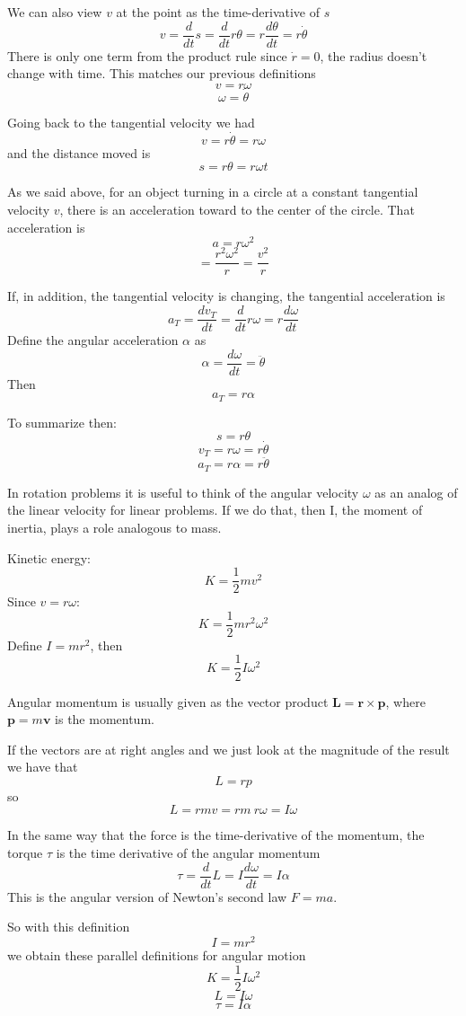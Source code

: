 \documentclass[11pt, oneside]{article}
\begin{document}
We can also view $v$ at the point as the time-derivative of $s$
\[ v = \frac{d}{dt} s = \frac{d}{dt} r \theta = r \frac{d \theta}{dt} = r \dot{\theta} \]
There is only one term from the product rule since $\dot{r} = 0$, the radius doesn't change with time.  This matches our previous definitions
\[ v = r \omega \]
\[ \omega = \dot{\theta} \]

Going back to the tangential velocity we had
\[ v = r \dot{\theta} = r \omega \]
and the distance moved is
\[ s = r \theta = r \omega t \]

As we said above, for an object turning in a circle at a constant tangential velocity $v$, there is an acceleration toward to the center of the circle.  That acceleration is
\[ a = r \omega^2  \]
\[ = \frac{r^2 \omega^2}{r} = \frac{v^2}{r} \]

If, in addition, the tangential velocity is changing, the tangential acceleration is
\[ a_T = \frac{dv_T}{dt} = \frac{d}{dt} r \omega = r \frac{d \omega}{dt}  \]
Define the angular acceleration $\alpha$ as
\[ \alpha = \frac{d\omega}{dt} =  \ddot{\theta}  \]
Then 
\[ a_T = r \alpha \]

To summarize then:
\[ s = r \theta \]
\[ v_T = r \omega = r \dot{\theta} \]
\[ a_T = r \alpha = r \ddot{\theta} \]

In rotation problems it is useful to think of the angular velocity $\omega$ as an analog of the linear velocity for linear problems.  If we do that, then I, the moment of inertia, plays a role analogous to mass.

Kinetic energy:
\[ K = \frac{1}{2} mv^2 \]
Since $v = r \omega$:
\[ K =  \frac{1}{2} m r^2 \omega^2 \]
Define $I = mr^2$, then
\[ K = \frac{1}{2} I \omega^2 \]

Angular momentum is usually given as the vector product $\mathbf{L} = \mathbf{r} \times \mathbf{p}$, where $\mathbf{p} = m \mathbf{v}$ is the momentum.

If the vectors are at right angles and we just look at the magnitude of the result we have that
\[ L = rp \]
so
\[ L = r mv = r m \ r \omega = I \omega \]

In the same way that the force is the time-derivative of the momentum, the torque $\tau$ is the time derivative of the angular momentum
\[ \tau = \frac{d}{dt} L = I \frac{d \omega}{dt} = I \alpha \]
This is the angular version of Newton's second law $F = ma$.

So with this definition
\[ I = mr^2 \]
we obtain these parallel definitions for angular motion
\[ K = \frac{1}{2} I \omega^2 \]
\[ L = I \omega \]
\[ \tau = I \alpha \]
\end{document}
